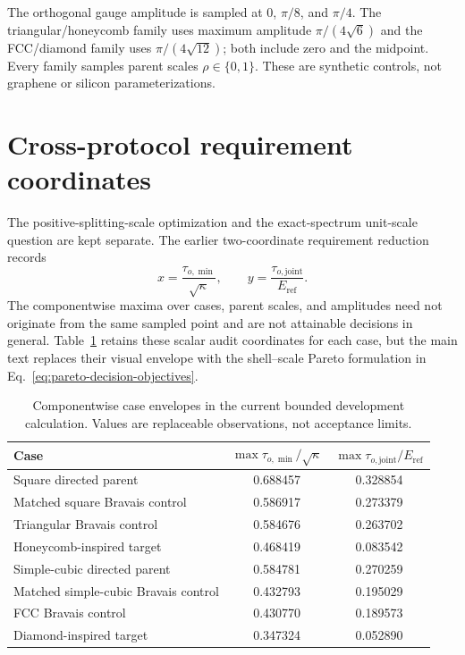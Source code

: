 The orthogonal gauge amplitude is sampled at $0$, $\pi/8$, and $\pi/4$. The
triangular/honeycomb family uses maximum amplitude $\pi/(4\sqrt6)$ and the FCC/diamond
family uses $\pi/(4\sqrt{12})$; both include zero and the midpoint. Every family samples
parent scales $\rho\in\{0,1\}$. These are synthetic controls, not graphene or silicon
parameterizations.

\section{Cross-protocol requirement coordinates}
\label{app:tolerance-requirements}

The positive-splitting-scale optimization and the exact-spectrum unit-scale question are
kept separate. The earlier two-coordinate requirement reduction records
\begin{equation}
 x=\frac{\tau_{o,\min}}{\sqrt\kappa},\qquad
 y=\frac{\tau_{o,\mathrm{joint}}}{E_{\mathrm{ref}}}.
 \label{eq:app-requirement-pair}
\end{equation}
The componentwise maxima over cases, parent scales, and amplitudes need not originate
from the same sampled point and are not attainable decisions in general.
Table~\ref{tab:app-case-requirements} retains these scalar audit coordinates for each
case, but the main text replaces their visual envelope with the shell--scale Pareto
formulation in Eq.~\eqref{eq:pareto-decision-objectives}.

\begin{table}[htbp]
\centering
\small
\caption{Componentwise case envelopes in the current bounded development calculation.
Values are replaceable observations, not acceptance limits.}
\label{tab:app-case-requirements}
\begin{tabular}{@{}lcc@{}}
\toprule
Case & $\max\tau_{o,\min}/\sqrt\kappa$ &
$\max\tau_{o,\mathrm{joint}}/E_{\mathrm{ref}}$ \\
\midrule
Square directed parent & 0.688457 & 0.328854 \\
Matched square Bravais control & 0.586917 & 0.273379 \\
Triangular Bravais control & 0.584676 & 0.263702 \\
Honeycomb-inspired target & 0.468419 & 0.083542 \\
Simple-cubic directed parent & 0.584781 & 0.270259 \\
Matched simple-cubic Bravais control & 0.432793 & 0.195029 \\
FCC Bravais control & 0.430770 & 0.189573 \\
Diamond-inspired target & 0.347324 & 0.052890 \\
\bottomrule
\end{tabular}
\end{table}

